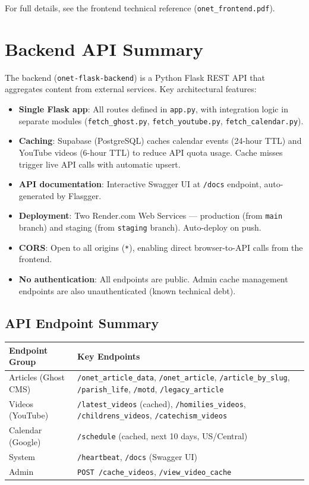 \documentclass[12pt]{article}
\begin{document}
For full details, see the frontend technical reference (\texttt{onet\_frontend.pdf}).

\section{Backend API Summary}

The backend (\texttt{onet-flask-backend}) is a Python Flask REST API that aggregates content from external services. Key architectural features:

\begin{itemize}
    \item \textbf{Single Flask app}: All routes defined in \texttt{app.py}, with integration logic in separate modules (\texttt{fetch\_ghost.py}, \texttt{fetch\_youtube.py}, \texttt{fetch\_calendar.py}).
    \item \textbf{Caching}: Supabase (PostgreSQL) caches calendar events (24-hour TTL) and YouTube videos (6-hour TTL) to reduce API quota usage. Cache misses trigger live API calls with automatic upsert.
    \item \textbf{API documentation}: Interactive Swagger UI at \texttt{/docs} endpoint, auto-generated by Flasgger.
    \item \textbf{Deployment}: Two Render.com Web Services --- production (from \texttt{main} branch) and staging (from \texttt{staging} branch). Auto-deploy on push.
    \item \textbf{CORS}: Open to all origins (\texttt{*}), enabling direct browser-to-API calls from the frontend.
    \item \textbf{No authentication}: All endpoints are public. Admin cache management endpoints are also unauthenticated (known technical debt).
\end{itemize}

\subsection{API Endpoint Summary}

\begin{longtable}{p{4cm}p{8.5cm}}
\toprule
\textbf{Endpoint Group} & \textbf{Key Endpoints} \\
\midrule
Articles (Ghost CMS) & \texttt{/onet\_article\_data}, \texttt{/onet\_article}, \texttt{/article\_by\_slug}, \texttt{/parish\_life}, \texttt{/motd}, \texttt{/legacy\_article} \\
\midrule
Videos (YouTube) & \texttt{/latest\_videos} (cached), \texttt{/homilies\_videos}, \texttt{/childrens\_videos}, \texttt{/catechism\_videos} \\
\midrule
Calendar (Google) & \texttt{/schedule} (cached, next 10 days, US/Central) \\
\midrule
System & \texttt{/heartbeat}, \texttt{/docs} (Swagger UI) \\
\midrule
Admin & \texttt{POST /cache\_videos}, \texttt{/view\_video\_cache} \\
\bottomrule
\end{longtable}
\end{document}
